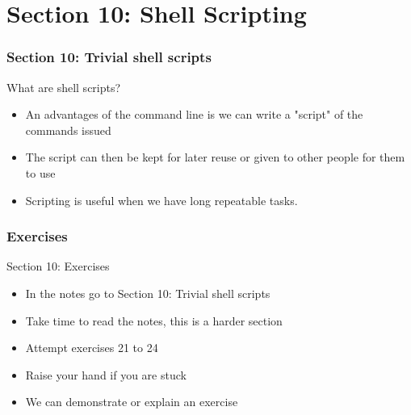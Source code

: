 \part{Section 10: Shell Scripting}
\begin{frame}
\partpage
\end{frame}

\section{Section 10: Trivial shell scripts}
\begin{frame}{What are shell scripts?}
\begin{itemize}
\item An advantages of the command line is we can write a "script" of the commands issued 
\item The script can then be kept for later reuse or given to other people for them to use
\item Scripting is useful when we have long repeatable tasks.
\end{itemize}
\end{frame}

\section{Exercises}
\begin{frame}{Section 10: Exercises}
\begin{itemize}
\item In the notes go to {Section 10: Trivial shell scripts}
\item Take time to read the notes, this is a harder section 
\item Attempt exercises 21 to 24
\item Raise your hand if you are stuck
\item We can demonstrate or explain an exercise
\end{itemize}
\end{frame}

